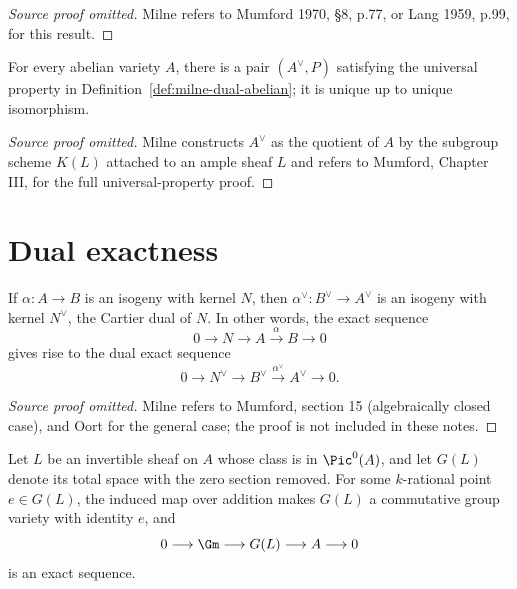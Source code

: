 \begin{proof}[Source proof omitted]
Milne refers to Mumford 1970, \S8, p.77, or Lang 1959, p.99, for this result.
\end{proof}

\begin{theorem}
\label{thm:milne-dual-existence}
For every abelian variety $A$, there is a pair $(A^\vee,P)$ satisfying the
universal property in Definition~\ref{def:milne-dual-abelian}; it is unique
up to unique isomorphism.
\end{theorem}

\begin{proof}[Source proof omitted]
Milne constructs $A^\vee$ as the quotient of $A$ by the subgroup scheme
$K(L)$ attached to an ample sheaf $L$ and refers to Mumford, Chapter III, for
the full universal-property proof.
\end{proof}

\section{Dual exactness}

\begin{theorem}
\label{thm:milne-dual-exact-sequence}

If $\alpha:A\to B$ is an isogeny with kernel $N$, then
$\alpha^\vee:B^\vee\to A^\vee$ is an isogeny with kernel $N^\vee$, the
Cartier dual of $N$.  In other words, the exact sequence
\[
0\longrightarrow N\longrightarrow A\xrightarrow{\alpha}B\longrightarrow0
\]
gives rise to the dual exact sequence
\[
0\longrightarrow N^\vee\longrightarrow B^\vee\xrightarrow{\alpha^\vee}
A^\vee\longrightarrow0.
\]
\end{theorem}

\begin{proof}[Source proof omitted]
Milne refers to Mumford, section 15 (algebraically closed case), and Oort for
the general case; the proof is not included in these notes.
\end{proof}

\begin{proposition}
\label{prop:milne-pic0-ext}

Let $L$ be an invertible sheaf on $A$ whose class is in $\Pic^0(A)$, and let
$G(L)$ denote its total space with the zero section removed.  For some
$k$-rational point $e\in G(L)$, the induced map over addition makes $G(L)$ a
commutative group variety with identity $e$, and
\[
0\longrightarrow\Gm\longrightarrow G(L)\longrightarrow A\longrightarrow0
\]
is an exact sequence.
\end{proposition}

